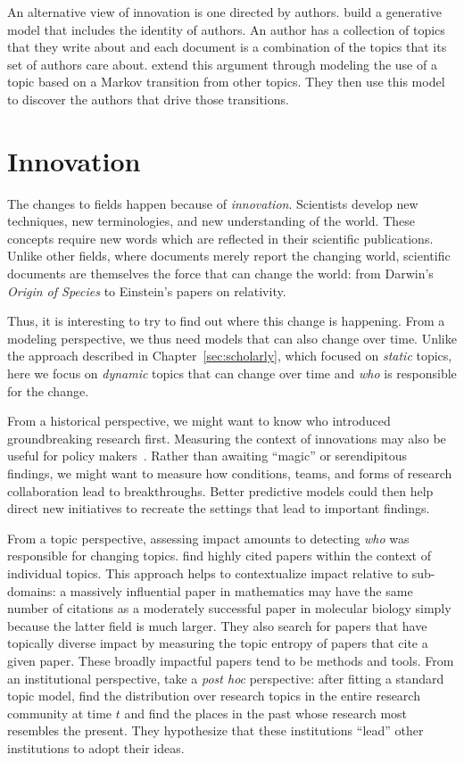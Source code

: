 An alternative view of innovation is one directed by authors.
\citet{steyvers-04,rosen-zvi-04} build a generative model that includes the
identity of authors.  
An author has a collection of topics that they write about and each
document is a combination of the topics that its set of authors care
about.  
\citet{zhou-06} extend this argument through modeling the use of a
topic based on a Markov transition from other topics.  
They then use this model to discover the authors that drive those transitions.  


\section{Innovation}

The changes to fields happen because of \emph{innovation}.  Scientists develop
new techniques, new terminologies, and new understanding of the world.  These
concepts require new words which are reflected in their scientific
publications.  Unlike other fields, where documents merely report the changing
world, scientific documents are themselves the force that can change the world:
from Darwin's \textit{Origin of Species} to Einstein's papers on
relativity.

Thus, it is interesting to try to find out where this change is
happening.  
From a modeling perspective, we thus need models that can also change
over time.
Unlike the approach described in Chapter~\ref{sec:scholarly}, which
focused on \emph{static} topics, here we focus on \emph{dynamic}
topics that can change over time and \emph{who} is responsible for the
change.

From
a historical perspective, we might want to know who introduced
groundbreaking research first.  Measuring the context of innovations may also be useful for policy makers~\citep{largent-12}.
Rather than awaiting ``magic'' or serendipitous findings, we might want to measure
how conditions, teams, and forms of research collaboration lead to breakthroughs.
Better predictive models could then help direct new initiatives to recreate the settings that lead to important findings.

From a topic perspective, assessing impact amounts to detecting \emph{who} was responsible
for changing topics.
\citet{mann-06} find highly cited papers within the context of individual topics.
This approach helps to contextualize impact relative to sub-domains: a massively influential paper in mathematics may have the same number of citations as a moderately successful paper in molecular biology simply because the latter field is much larger.
They also search for papers that have topically diverse impact by measuring the topic entropy of papers that cite a given paper.
These broadly impactful papers tend to be methods and tools.
From an institutional perspective, \citet{ramage-10} take
a \textit{post hoc} perspective: after fitting a standard  topic model,
find the distribution over research topics in the entire research community at
time $t$ and find the places in the past whose research most resembles the present.  They hypothesize that these institutions ``lead'' other institutions to adopt
their ideas. %

